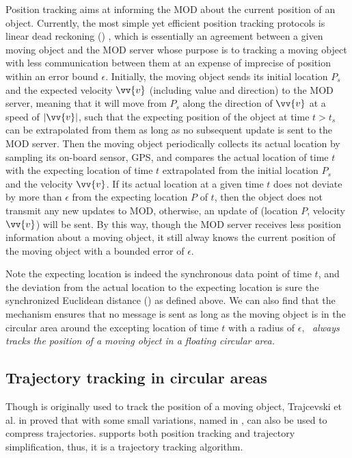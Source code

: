 Position tracking aims at informing the MOD about the current position of an object. Currently, the most simple yet efficient position tracking protocols is linear dead reckoning (\ldr) \cite{Lange:Tracking, Leonhardi:Comparison, Civilis:Techniques, Wolfson:Databases}, which is essentially an agreement between a given moving object and the MOD server whose purpose is to tracking a moving object with less communication between them at an expense of imprecise of position within an error bound $\epsilon$.  
%
Initially, the moving object sends its initial location $P_s$ and the expected velocity $\vv{v}$
(including value and direction) to the MOD server, meaning that it will move from $P_s$ along the direction of $\vv{v}$ at a speed of $|\vv{v}|$, such that the expecting position of the object at time $t>t_s$ can be extrapolated from them as long as no subsequent update is sent to the MOD server.
%
Then the moving object periodically collects its actual location by sampling its on-board sensor, \eg GPS, and compares the actual location of time $t$ with the expecting location of time $t$ extrapolated from the initial location $P_s$ and the velocity $\vv{v}$. If its actual location at a given time $t$ does not deviate by more than $\epsilon$ from the expecting location $P$ of $t$, then the object does not transmit any new updates to MOD, otherwise, an update of (location $P$, velocity $\vv{v}$) will be sent.
%
By this way, though the MOD server receives less position information about a moving object, it still alway knows the current position of the moving object with a bounded error of $\epsilon$.


Note the expecting location is indeed the synchronous data point \wrt of time $t$, and the deviation from the actual location to the expecting location is sure the synchronized Euclidean distance (\sed) as defined above. We can also find that the \ldr mechanism ensures that no message is sent as long as the moving object is in the circular area around the excepting location of time $t$ with a radius of $\epsilon$, \ie~\emph{\ldr always tracks the position of a moving object in a floating circular area.}


\subsection{Trajectory tracking in circular areas}
Though \ldr is originally used to track the position of a moving object, Trajcevski et al. in \cite{Trajcevski:LDRH} proved that \ldr with some small variations, named \ldrh in \cite{Lange:Tracking}, can also be used to compress trajectories. 
\ldrh supports both position tracking and trajectory simplification, thus, it is a trajectory tracking algorithm.

